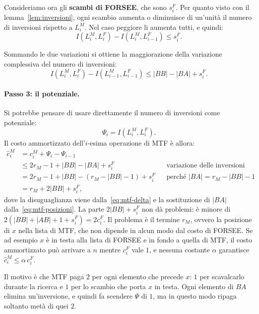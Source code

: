 Consideriamo ora gli \textbf{scambi di FORSEE}, che sono $s^F_i$. Per quanto visto con il lemma~\ref{lem:inversioni}, ogni scambio aumenta o diminuisce di un'unità il numero di inversioni rispetto a $L^M_i$. Nel caso peggiore li aumenta tutti, e quindi:
\[
I(L^M_i, L^F_i) - I(L^M_i, L^F_{i-1}) \le s^F_i.
\]

Sommando le due variazioni si ottiene la maggiorazione della variazione complessiva del numero di inversioni:
\begin{equation}\label{eq:mtf-delta}
I(L^M_i, L^F_i) - I(L^M_{i-1}, L^F_{i-1}) \le |BB| - |BA| + s^F_i.
\end{equation}

\paragraph{Passo 3: il potenziale.}
Si potrebbe pensare di usare direttamente il numero di inversioni come potenziale:
\[
\Psi_i = I(L^M_i, L^F_i).
\]
Il costo ammortizzato dell'$i$-esima operazione di MTF è allora:
\[
\begin{aligned}
\hat{c}^M_i &= c^M_i + \Psi_i - \Psi_{i-1} \\
&\le 2r_M - 1 + |BB| - |BA| + s^F_i && \text{variazione delle inversioni} \\
&= 2r_M - 1 + |BB| - (r_M - |BB| - 1) + s^F_i && \text{perché } |BA| = r_M - |BB| - 1 \\
&= r_M + 2|BB| + s^F_i,
\end{aligned}
\]
dove la disuguaglianza viene dalla~\eqref{eq:mtf-delta} e la sostituzione di $|BA|$ dalla~\eqref{eq:mtf-posizioni}. La parte $2|BB| + s^F_i$ non dà problemi: è minore di $2(|BB| + |AB| + 1 + s^F_i) = 2c^F_i$. Il problema è il termine $r_M$, ovvero la posizione di $x$ nella lista di MTF, che non dipende in alcun modo dal costo di FORSEE. Se ad esempio $x$ è in testa alla lista di FORSEE e in fondo a quella di MTF, il costo ammortizzato può arrivare a $n$ mentre $c^F_i$ vale $1$, e nessuna costante $\alpha$ garantisce $\hat{c}^M_i \le \alpha\, c^F_i$.

Il motivo è che MTF paga $2$ per ogni elemento che precede $x$: $1$ per scavalcarlo durante la ricerca e $1$ per lo scambio che porta $x$ in testa. Ogni elemento di $BA$ elimina un'inversione, e quindi fa scendere $\Psi$ di $1$, ma in questo modo ripaga soltanto metà di quei $2$.

